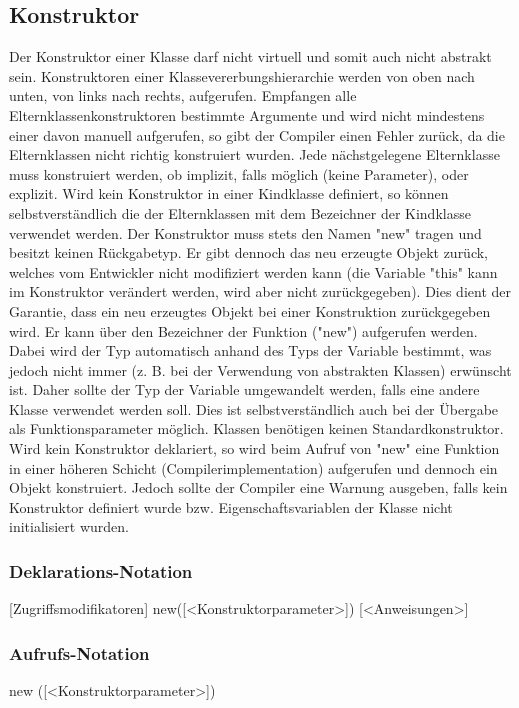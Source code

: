 \subsection{Konstruktor}
Der Konstruktor einer Klasse darf nicht virtuell und somit auch nicht abstrakt sein.
Konstruktoren einer Klassevererbungshierarchie werden von oben nach unten, von links nach rechts, aufgerufen.
Empfangen alle Elternklassenkonstruktoren bestimmte Argumente und wird nicht mindestens einer davon manuell aufgerufen,
so gibt der Compiler einen Fehler zurück, da die Elternklassen nicht richtig konstruiert wurden.
Jede nächstgelegene Elternklasse muss konstruiert werden, ob implizit, falls möglich (keine Parameter), oder explizit.
Wird kein Konstruktor in einer Kindklasse definiert, so können selbstverständlich die der Elternklassen mit dem Bezeichner
der Kindklasse verwendet werden.
Der Konstruktor muss stets den Namen "new" tragen und besitzt keinen Rückgabetyp. Er gibt dennoch das neu erzeugte Objekt zurück,
welches vom Entwickler nicht modifiziert werden kann (die Variable "this" kann im Konstruktor verändert werden, wird aber nicht
zurückgegeben).
Dies dient der Garantie, dass ein neu erzeugtes Objekt bei einer Konstruktion zurückgegeben wird.
Er kann über den Bezeichner der Funktion ("new") aufgerufen werden.
Dabei wird der Typ automatisch anhand des Typs der Variable bestimmt, was jedoch nicht immer (z. B. bei der Verwendung von abstrakten Klassen) erwünscht ist. Daher sollte der Typ der Variable umgewandelt werden, falls eine andere Klasse verwendet werden soll.
Dies ist selbstverständlich auch bei der Übergabe als Funktionsparameter möglich.
Klassen benötigen keinen Standardkonstruktor. Wird kein Konstruktor deklariert, so wird beim Aufruf von "new" eine Funktion in einer höheren
Schicht (Compilerimplementation) aufgerufen und dennoch ein Objekt konstruiert. Jedoch sollte der Compiler eine Warnung ausgeben, falls kein
Konstruktor definiert wurde bzw. Eigenschaftsvariablen der Klasse nicht initialisiert wurden.

\subsubsection{Deklarations-Notation}
[Zugriffsmodifikatoren] new([<Konstruktorparameter>]) { [<Anweisungen>] }

\subsubsection{Aufrufs-Notation}
new ([<Konstruktorparameter>])

